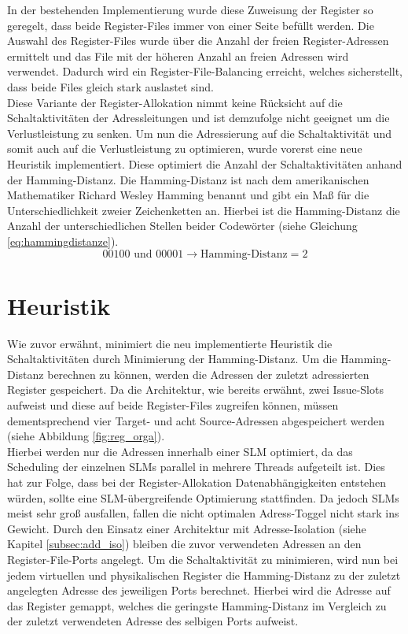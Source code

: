 In der bestehenden Implementierung wurde diese Zuweisung der Register so geregelt, dass beide Register-Files immer von einer Seite befüllt werden. Die Auswahl des Register-Files wurde über die Anzahl der freien Register-Adressen ermittelt und das File mit der höheren Anzahl an freien Adressen wird verwendet. Dadurch wird ein Register-File-Balancing erreicht, welches sicherstellt, dass beide Files gleich stark auslastet sind.\\
Diese Variante der Register-Allokation nimmt keine Rücksicht auf die Schaltaktivitäten der Adressleitungen und ist demzufolge nicht geeignet um die Verlustleistung zu senken.
Um nun die Adressierung auf die Schaltaktivität und somit auch auf die Verlustleistung zu optimieren, wurde vorerst eine neue Heuristik implementiert.
Diese optimiert die Anzahl der Schaltaktivitäten anhand der Hamming-Distanz.
Die Hamming-Distanz ist nach dem amerikanischen Mathematiker Richard Wesley Hamming benannt und gibt ein Maß für die Unterschiedlichkeit zweier Zeichenketten an. Hierbei ist die Hamming-Distanz die Anzahl der unterschiedlichen Stellen beider Codewörter (siehe Gleichung \ref{eq:hammingdistanze}). \cite{hamming1950error}
\begin{equation}
00100 \text{ und } 00001 \rightarrow \text{Hamming-Distanz}= 2
\label{eq:hammingdistanze}
\end{equation}
 
\section{Heuristik}
\label{sec:Heuristik}
Wie zuvor erwähnt, minimiert die neu implementierte Heuristik die Schaltaktivitäten durch Minimierung der Hamming-Distanz. Um die Hamming-Distanz berechnen zu können, werden die Adressen der zuletzt adressierten Register gespeichert. Da die Architektur, wie bereits erwähnt, zwei Issue-Slots aufweist und diese auf beide Register-Files zugreifen können, müssen dementsprechend vier Target- und acht Source-Adressen abgespeichert werden (siehe Abbildung \ref{fig:reg_orga}).\\
Hierbei werden nur die Adressen innerhalb einer SLM optimiert, da das Scheduling der einzelnen SLMs parallel in mehrere Threads aufgeteilt ist. Dies hat zur Folge, dass bei der Register-Allokation Datenabhängigkeiten entstehen würden, sollte eine SLM-übergreifende Optimierung stattfinden. Da jedoch SLMs meist sehr groß ausfallen, fallen die nicht optimalen Adress-Toggel nicht stark ins Gewicht. 
Durch den Einsatz einer Architektur mit Adresse-Isolation (siehe Kapitel \ref{subsec:add_iso}) bleiben die zuvor verwendeten Adressen an den Register-File-Ports angelegt. Um die Schaltaktivität zu minimieren, wird nun bei jedem virtuellen und physikalischen Register die Hamming-Distanz zu der zuletzt angelegten Adresse des jeweiligen Ports berechnet. Hierbei wird die Adresse auf das Register gemappt, welches die geringste Hamming-Distanz im Vergleich zu der zuletzt verwendeten Adresse des selbigen Ports aufweist.\\

